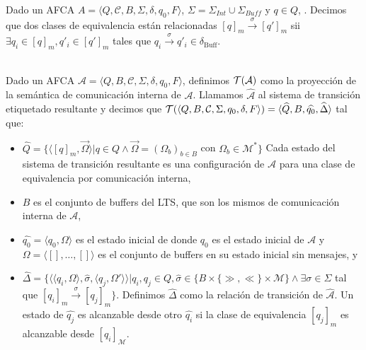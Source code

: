 Dado un AFCA $A = \langle Q, \mathcal{C}, B, \Sigma, \delta, q_0, F \rangle$, $\Sigma = \Sigma_\mathit{Int} \cup \Sigma_\mathit{Buff}$ y $q \in Q$, . Decimos que dos clases de equivalencia están relacionadas $[q]_m \xrightarrow{\sigma} [q']_m$ sii $\exists q_i \in [q]_m, q'_i \in [q']_m$ tales que $q_i \xrightarrow{\sigma} q'_i \in \delta_{\text{Buff}}$.

\begin{definition}\label{def:pci}\ \\
Dado un AFCA $\mathcal{A} = \langle Q, B, \mathcal{C}, \Sigma, \delta, q_0, F \rangle$, definimos $\mathcal{T}(\mathcal{A})$ como la proyección de la semántica de comunicación interna de $\mathcal{A}$. Llamamos $\widehat{\mathcal{A}}$ al sistema de transición etiquetado resultante y decimos que $\mathcal{T} (\langle Q, B, \mathcal{C}, \Sigma, q_0, \delta, F \rangle)= \langle \widehat{Q}, B, \widehat{q_0}, \widehat{\Delta} \rangle$ tal que:
\begin{itemize}
    \item $ \widehat{Q} = \{ \langle [q]_m, \overrightarrow{\Omega} \rangle | q \in Q \land \overrightarrow{\Omega} = (\Omega_b)_{b \in B}$ con $\Omega_b \in \mathcal{M}^* \}$ Cada estado del sistema de transición resultante es una configuración de $\mathcal{A}$ para una clase de equivalencia por comunicación interna,
    \item $B$ es el conjunto de buffers del LTS, que son los mismos de comunicación interna de $\mathcal{A}$,
    \item $\widehat{q_0}= \langle q_0, \Omega \rangle$ es el estado inicial de  donde $q_0$ es el estado inicial de $\mathcal{A}$ y $\Omega = \langle [], \ldots, [] \rangle$ es el conjunto de buffers en su estado inicial sin mensajes, y
    \item $\widehat{\Delta}= \{\langle \langle q_i, \Omega \rangle, \widehat{\sigma},\langle q_j, \Omega' \rangle \rangle | q_i, q_j \in Q, \widehat{\sigma} \in \{B \times \{\gg, \ll\} \times \mathcal{M}\} \land \exists \sigma \in \Sigma$ tal que  $[q_i]_m \xrightarrow{\sigma} [q_j]_m \}$. Definimos $\widehat{\Delta}$ como la relación de transición de $\widehat{\mathcal{A}}$. Un estado de $\widehat{q_j}$ es alcanzable desde otro $\widehat{q_i}$ si la clase de equivalencia $[q_j]_m$ es alcanzable desde $[q_i]_\mathcal{M}$.
\end{itemize}
\end{definition}


